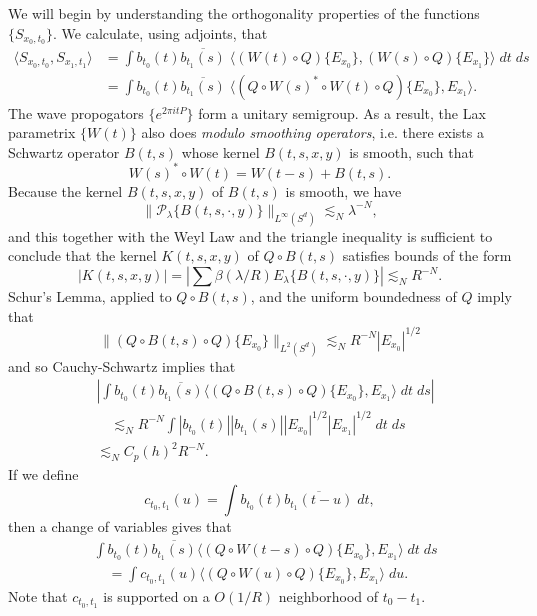 We will begin by understanding the orthogonality properties of the functions $\{ {S\!}_{x_0,t_0} \}$. We calculate, using adjoints, that
%
\begin{align*}
    \langle {S\!}_{x_0,t_0}, {S\!}_{x_1,t_1} \rangle &= \int b_{t_0}(t) \overline{b_{t_1}(s)}\; \Big\langle (W(t) \circ Q) \{ E_{x_0} \}, (W(s) \circ Q) \{ E_{x_1} \} \Big\rangle\; dt\; ds\\
    &= \int b_{t_0}(t) \overline{b_{t_1}(s)}\; \Big\langle (Q \circ W(s)^* \circ W(t) \circ Q) \{ E_{x_0} \}, E_{x_1} \Big\rangle.
\end{align*}
%
The wave propogators $\{ e^{2 \pi i t P} \}$ form a unitary semigroup. As a result, the Lax parametrix $\{ W(t) \}$ also does  \emph{modulo smoothing operators}, i.e. there exists a Schwartz operator $B(t,s)$ whose kernel $B(t,s,x,y)$ is smooth, such that
%
\[ W(s)^* \circ W(t) = W(t - s) + B(t,s). \]
%
Because the kernel $B(t,s,x,y)$ of $B(t,s)$ is smooth, we have
%
\[ \| \mathcal{P}_\lambda \{ B(t,s,\cdot,y) \} \|_{L^\infty(S^d)} \lesssim_N \lambda^{-N}, \]
%
and this together with the Weyl Law and the triangle inequality is sufficient to conclude that the kernel $K(t,s,x,y)$ of $Q \circ B(t,s)$ satisfies bounds of the form
%
\[ |K(t,s,x,y)| = \left| \sum \beta(\lambda / R) E_\lambda \{ B(t,s,\cdot,y) \} \right| \lesssim_N R^{-N}. \]
%
Schur's Lemma, applied to $Q \circ B(t,s)$, and the uniform boundedness of $Q$ imply that
%
\[ \| (Q \circ B(t,s) \circ Q) \{ E_{x_0} \} \|_{L^2(S^d)} \lesssim_N R^{-N} |E_{x_0}|^{1/2} \]
%
and so Cauchy-Schwartz implies that
%
\begin{align*}
    &\left| \int b_{t_0}(t) \overline{b_{t_1}(s)} \langle (Q \circ B(t,s) \circ Q) \{ E_{x_0} \}, E_{x_1} \rangle\; dt\; ds \right|\\
    &\quad \lesssim_N R^{-N} \int |b_{t_0}(t)| |b_{t_1}(s)| |E_{x_0}|^{1/2} |E_{x_1}|^{1/2}\; dt\; ds\\
    &\lesssim_N C_p(h)^2 R^{-N}.
\end{align*}
%
If we define
%
\[ c_{t_0,t_1}(u) = \int b_{t_0}(t) \overline{b_{t_1}(t - u)}\; dt, \]
%
then a change of variables gives that
%
\begin{align*}
    &\int b_{t_0}(t) \overline{b_{t_1}(s)} \langle (Q \circ W(t-s) \circ Q) \{ E_{x_0} \}, E_{x_1} \rangle\; dt\; ds\\
    &\quad = \int c_{t_0,t_1}(u) \Big\langle (Q \circ W(u) \circ Q) \{ E_{x_0} \}, E_{x_1} \Big\rangle\; du.
\end{align*}
Note that $c_{t_0,t_1}$ is supported on a $O(1/R)$ neighborhood of $t_0 - t_1$.

